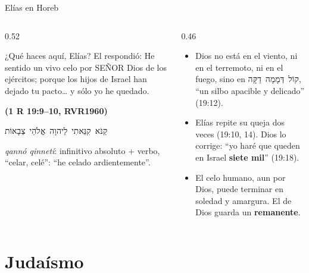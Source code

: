 \documentclass[hyperref={bookmarks=false},aspectratio=169]{beamer}
\newcommand{\heb}[1]{\mbox{\foreignlanguage{hebrew}{#1}}}
\newcommand{\SENOR}{S{\fontsize{0.78em}{1em}\selectfont EÑOR}}
\newcommand{\fuente}[1]{\par\hfill{\upshape\bfseries\footnotesize\textcolor{azul}{#1}}}
\newcommand{\destacar}[1]{\textbf{\textcolor{azul}{#1}}}
\begin{document}
\begin{frame}{Elías en Horeb}
\begin{columns}[t,onlytextwidth]
\begin{column}{0.52\textwidth}
\begin{cita}¿Qué haces aquí, Elías? El respondió: He sentido un vivo celo por \SENOR{} Dios de los ejércitos; porque los hijos de Israel han dejado tu pacto\ldots{} y sólo yo he quedado.\fuente{(1 R 19:9--10, RVR1960)}\end{cita}
\begin{center}\heb{קַנֹּא קִנֵּאתִי לַיהוָה אֱלֹהֵי צְבָאוֹת}\end{center}
\scriptsize \emph{qannó qinnetí}: infinitivo absoluto + verbo, ``celar, celé'': ``he celado ardientemente''.
\end{column}
\begin{column}{0.46\textwidth}\small
\begin{itemize}
\item Dios no está en el viento, ni en el terremoto, ni en el fuego, sino en \heb{קוֹל דְּמָמָה דַקָּה}, ``un silbo apacible y delicado'' (19:12).
\item Elías repite su queja dos veces (19:10, 14). Dios lo corrige: ``yo haré que queden en Israel \destacar{siete mil}'' (19:18).
\item El celo humano, aun por Dios, puede terminar en soledad y amargura. El de Dios guarda un \destacar{remanente}.
\end{itemize}
\end{column}
\end{columns}
\end{frame}

\section{Judaísmo}
\end{document}
